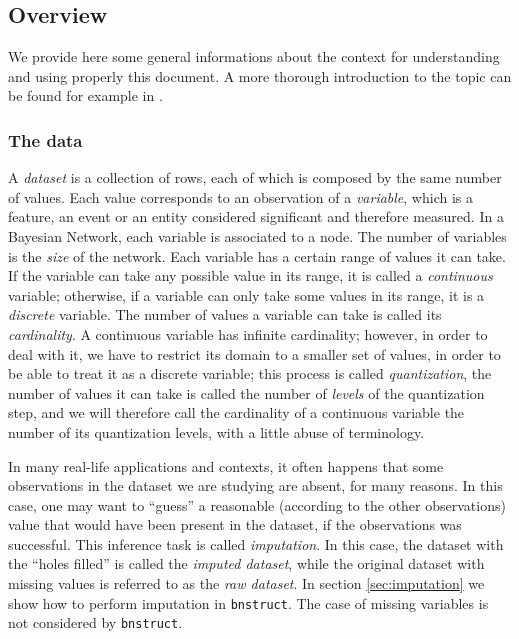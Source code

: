 \documentclass{article}\usepackage[]{graphicx}\usepackage[]{color}
\newcommand{\Rpackage}[1]{{\texttt{#1}}}
\begin{document}
\subsection{Overview}
We provide here some general informations about the context for understanding
and using properly this document. A more thorough introduction to the topic can be found for example in
\citet{koller2009probabilistic}.

\subsubsection{The data}
A \emph{dataset} is a collection of rows, each of which is composed by the same number
of values. Each value corresponds to an observation of a \emph{variable}, which is a feature,
an event or an entity considered significant and therefore measured. In a Bayesian Network,
each variable is associated to a node. The number of variables is the \emph{size} of the
network. Each variable has a certain range of values it can take. If the variable can take
any possible value in its range, it is called a \emph{continuous} variable; otherwise,
if a variable can only take some values in its range, it is a \emph{discrete} variable.
The number of values a variable can take is called its \emph{cardinality}.
A continuous variable has infinite cardinality; however, in order to deal with it,
we have to restrict its domain to a smaller set of values, in order to be able to
treat it as a discrete variable; this process is called \emph{quantization}, the
number of values it can take is called the number of \emph{levels} of the quantization step,
and we will therefore call the cardinality of a continuous variable the number of its
quantization levels, with a little abuse of terminology.

In many real-life applications and contexts, it often happens that some observations in
the dataset we are studying are absent, for many reasons. In this case, one may want to
``guess'' a reasonable (according to the other observations) value that would have been
present in the dataset, if the observations was successful. This inference task is
called \emph{imputation}. In this case, the dataset with the ``holes filled''
is called the \emph{imputed dataset}, while the original dataset with missing values is
referred to as the \emph{raw dataset}.
In section \ref{sec:imputation} we show how to perform imputation in \Rpackage{bnstruct}.
The case of missing variables is not considered by \Rpackage{bnstruct}.
\end{document}
